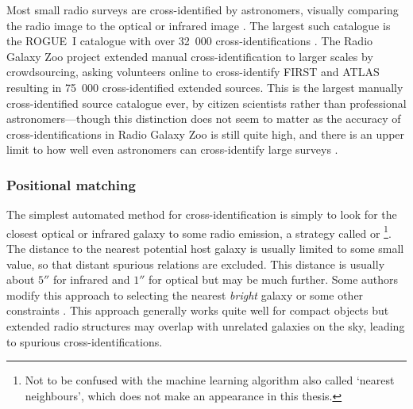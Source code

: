         \begin{sloppypar}
        Most small radio surveys are cross-identified by astronomers, visually comparing the radio image to the optical or infrared image \citep[e.g.][]{norris06,middelberg08}. The largest such catalogue is the ROGUE~I catalogue with over 32~000 cross-identifications \citep{zywucka_catalogue_2020}. The Radio Galaxy Zoo project \citep{banfield15} extended manual cross-identification to larger scales by crowdsourcing, asking volunteers online to cross-identify FIRST and ATLAS resulting in 75~000 cross-identified extended sources. This is the largest manually cross-identified source catalogue ever, by citizen scientists rather than professional astronomers---though this distinction does not seem to matter as the accuracy of cross-identifications in Radio Galaxy Zoo is still quite high, and there is an upper limit to how well even astronomers can cross-identify large surveys \citep{wong21rgz,banfield15}.
        \end{sloppypar}

        \subsubsection{Positional matching}
        \label{sec:xid-posmatch}

            The simplest automated method for cross-identification is simply to look for the closest optical or infrared galaxy to some radio emission, a strategy called  or \footnote{Not to be confused with the machine learning algorithm also called `nearest neighbours', which does not make an appearance in this thesis.}. The distance to the nearest potential host galaxy is usually limited to some small value, so that distant spurious relations are excluded. This distance is usually about $5''$ for infrared and $1''$ for optical but may be much further. Some authors modify this approach to selecting the nearest \emph{bright} galaxy or some other constraints \citep[e.g.][]{kimball08}. This approach generally works quite well for compact objects but extended radio structures may overlap with unrelated galaxies on the sky, leading to spurious cross-identifications.

